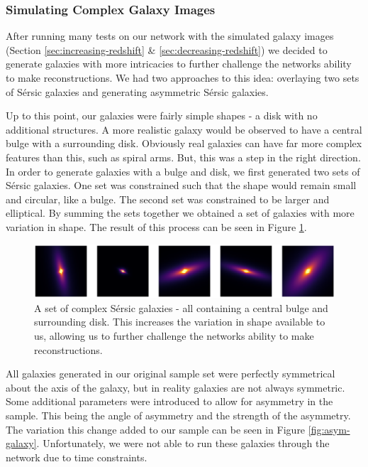 \documentclass[fleqn,usenatbib]{mnras}
\begin{document}
\subsubsection{Simulating Complex Galaxy Images} \label{sec:complex}
After running many tests on our network with the simulated galaxy images (Section \ref{sec:increasing-redshift} \& \ref{sec:decreasing-redshift}) we decided to generate galaxies with more intricacies to further challenge the networks ability to make reconstructions. We had two approaches to this idea: overlaying two sets of S\'ersic galaxies and generating asymmetric S\'ersic galaxies.

Up to this point, our galaxies were fairly simple shapes - a disk with no additional structures. A more realistic galaxy would be observed to have a central bulge with a surrounding disk. Obviously real galaxies can have far more complex features than this, such as spiral arms. But, this was a step in the right direction. In order to generate galaxies with a bulge and disk, we first generated two sets of S\'ersic galaxies. One set was constrained such that the shape would remain small and circular, like a bulge. The second set was constrained to be larger and elliptical. By summing the sets together we obtained a set of galaxies with more variation in shape. The result of this process can be seen in Figure \ref{fig:complex-galaxy}.

\begin{figure}
	\includegraphics[width=\columnwidth]{Figures/complex-galaxy-v2.png}
    \caption{A set of complex S\'ersic galaxies - all containing a central bulge and surrounding disk. This increases the variation in shape available to us, allowing us to further challenge the networks ability to make reconstructions.}
    \label{fig:complex-galaxy}
\end{figure}

All galaxies generated in our original sample set were perfectly symmetrical about the axis of the galaxy, but in reality galaxies are not always symmetric. Some additional parameters were introduced to allow for asymmetry in the sample. This being the angle of asymmetry and the strength of the asymmetry. The variation this change added to our sample can be seen in Figure \ref{fig:asym-galaxy}. Unfortunately, we were not able to run these galaxies through the network due to time constraints.
\end{document}
